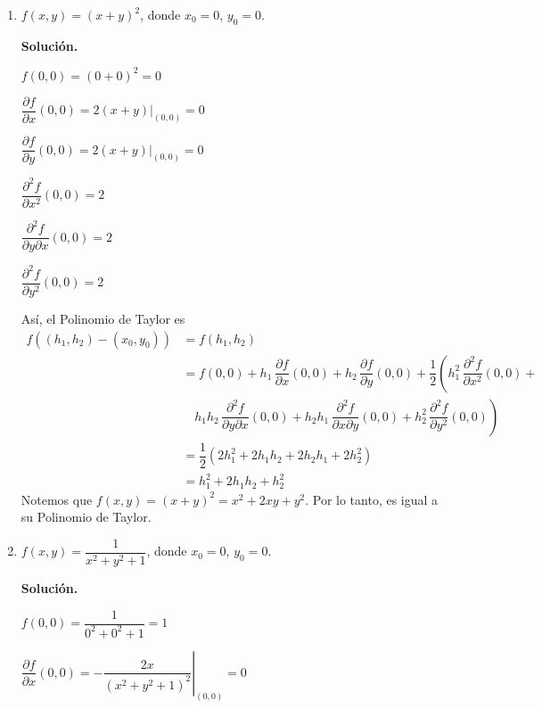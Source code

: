 \documentclass[fleqn, 12pt]{article}
\newcommand{\derivadaparcial}[2]{\dfrac{\partial {#1}}{\partial {#2}}}
\newcommand{\derivadaparcialn}[3]{\dfrac{\partial^{#3} {#1}}{\partial {#2}^{#3}}}
\newcommand{\derivadaparcialnd}[3]{\dfrac{\partial^{2} {#1}}{\partial {#3} \partial {#2}}}
\begin{document}
    \begin{enumerate}
        \item $ f(x,y) = (x + y)^2 $, donde $ x_0 = 0 $, $ y_0 = 0 $.
        
        \textbf{Solución.}

        $ f(0,0) = (0 + 0)^2 = 0 $

        $ \derivadaparcial{f}{x} (0,0) = \left. 2(x + y) \right|_{(0,0)} = 0 $

        $ \derivadaparcial{f}{y} (0,0) = \left. 2(x + y) \right|_{(0,0)} = 0 $

        $ \derivadaparcialn{f}{x}{2} (0,0) = 2 $

        $ \derivadaparcialnd{f}{x}{y} (0,0) = 2 $

        $ \derivadaparcialn{f}{y}{2} (0,0) = 2 $

        Así, el Polinomio de Taylor es
        \begin{align*}
            f((h_1, h_2) - (x_0, y_0)) &= f(h_1, h_2) \\
            &= f(0,0) + h_1 \, \derivadaparcial{f}{x} (0,0) + h_2 \, \derivadaparcial{f}{y} (0,0) + \dfrac{1}{2} \left( h_1^2 \, \derivadaparcialn{f}{x}{2} (0,0) \right. + \\
            & \quad \left. h_1 h_2 \, \derivadaparcialnd{f}{x}{y} (0,0) + h_2 h_1 \, \derivadaparcialnd{f}{y}{x} (0,0) + h_2^2 \, \derivadaparcialn{f}{y}{2} (0,0) \right) \\
            &= \dfrac{1}{2} \left( 2 h_1^2 + 2 h_1 h_2 + 2 h_2 h_1 + 2 h_2^2 \right) \\
            &= h_1^2 + 2 h_1 h_2 + h_2^2
        \end{align*}
        Notemos que $ f(x,y) = (x + y)^2 = x^2 + 2xy + y^2 $. Por lo tanto, es igual a su Polinomio de Taylor.

        \item $ f(x,y) = \dfrac{1}{x^2 + y^2 + 1} $, donde $ x_0 = 0 $, $ y_0 = 0 $.
        
        \textbf{Solución.}

        $ f(0,0) = \dfrac{1}{0^2 + 0^2 + 1} = 1 $

        $ \derivadaparcial{f}{x} (0,0) = \left. - \dfrac{2x}{(x^2 + y^2 + 1)^2} \right|_{(0,0)} = 0 $


\end{enumerate}
\end{document}
